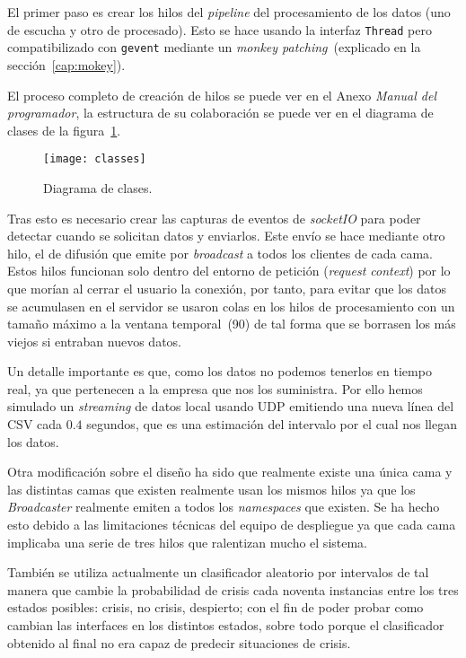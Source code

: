 El primer paso es crear los hilos del \textit{pipeline} del procesamiento de los datos (uno de escucha y otro de procesado). Esto se hace usando la interfaz \texttt{Thread} pero compatibilizado con \texttt{gevent} mediante un \textit{monkey patching}~(explicado en la sección~\ref{cap:mokey}).

El proceso completo de creación de hilos se puede ver en el Anexo \textit{Manual del programador}, la estructura de su colaboración se puede ver en el diagrama de clases de la figura~\ref{fig:classes}.

\begin{figure}
	\centering
	\texttt{[image: classes]}
	\caption{Diagrama de clases.}
	\label{fig:classes}
\end{figure}

Tras esto es necesario crear las capturas de eventos de \textit{socketIO} para poder detectar cuando se solicitan datos y enviarlos. Este envío se hace mediante otro hilo, el de difusión que emite por \textit{broadcast} a todos los clientes de cada cama. Estos hilos funcionan solo dentro del entorno de petición (\textit{request context}) por lo que morían al cerrar el usuario la conexión, por tanto, para evitar que los datos se acumulasen en el servidor se usaron colas en los hilos de procesamiento con un tamaño máximo a la ventana temporal~(90) de tal forma que se borrasen los más viejos si entraban nuevos datos.

Un detalle importante es que, como los datos no podemos tenerlos en tiempo real, ya que pertenecen a la empresa que nos los suministra. Por ello hemos simulado un \textit{streaming} de datos local usando UDP emitiendo una nueva línea del CSV cada $0.4$ segundos, que es una estimación del intervalo por el cual nos llegan los datos.

Otra modificación sobre el diseño ha sido que realmente existe una única cama y las distintas camas que existen realmente usan los mismos hilos ya que los \textit{Broadcaster} realmente emiten a todos los \textit{namespaces} que existen. Se ha hecho esto debido a las limitaciones técnicas del equipo de despliegue ya que cada cama implicaba una serie de tres hilos que ralentizan mucho el sistema.

También se utiliza actualmente un clasificador aleatorio por intervalos de tal manera que cambie la probabilidad de crisis cada noventa instancias entre los tres estados posibles: crisis, no crisis, despierto; con el fin de poder probar como cambian las interfaces en los distintos estados, sobre todo porque el clasificador obtenido al final no era capaz de predecir situaciones de crisis.


